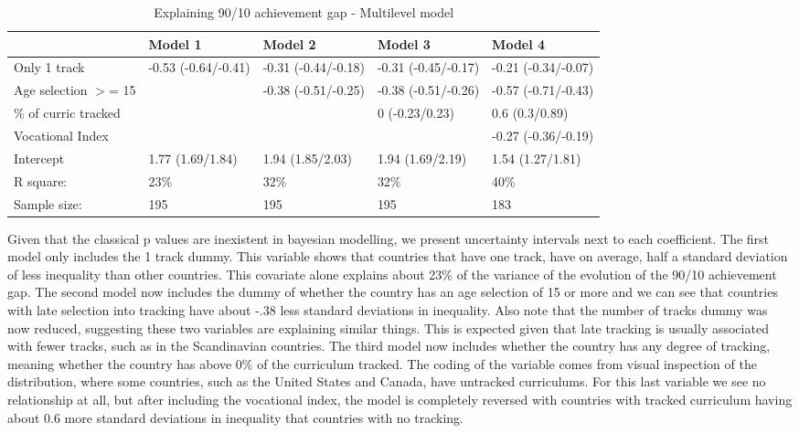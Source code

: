 \documentclass[11pt, a4paper]{article}\usepackage[]{graphicx}\usepackage[]{color}
\begin{document}
\begin{table}[ht]
\centering
\begin{tabular}{lllll}
  \hline
  & Model 1 & Model 2 & Model 3 & Model 4 \\ 
  \hline
Only 1 track & -0.53 (-0.64/-0.41) & -0.31 (-0.44/-0.18) & -0.31 (-0.45/-0.17) & -0.21 (-0.34/-0.07) \\ 
  Age selection $>$= 15 &  & -0.38 (-0.51/-0.25) & -0.38 (-0.51/-0.26) & -0.57 (-0.71/-0.43) \\ 
  \% of curric tracked &  &  & 0 (-0.23/0.23) & 0.6 (0.3/0.89) \\ 
  Vocational Index &  &  &  & -0.27 (-0.36/-0.19) \\ 
  Intercept & 1.77 (1.69/1.84) & 1.94 (1.85/2.03) & 1.94 (1.69/2.19) & 1.54 (1.27/1.81) \\ 
   \hline R square: & 23\% & 32\% & 32\% & 40\% \\ Sample size: & 195 & 195 & 195 & 183 \\ \hline \hline
\end{tabular}
\caption{Explaining 90/10 achievement gap - Multilevel model} 
\end{table}


Given that the classical p values are inexistent in bayesian modelling, we present uncertainty intervals next to each coefficient. The first model only includes the 1 track dummy. This variable shows that countries that have one track, have on average, half a standard deviation of less inequality than other countries. This covariate alone explains about 23\% of the variance of the evolution of the 90/10 achievement gap. The second model now includes the dummy of whether the country has an age selection of 15 or more and we can see that countries with late selection into tracking have about -.38 less standard deviations in inequality. Also note that the number of tracks dummy was now reduced, suggesting these two variables are explaining similar things. This is expected given that late tracking is usually associated with fewer tracks, such as in the Scandinavian countries. The third model now includes whether the country has any degree of tracking, meaning whether the country has above 0\% of the curriculum tracked. The coding of the variable comes from visual inspection of the distribution, where some countries, such as the United States and Canada, have untracked curriculums. For this last variable we see no relationship at all, but after including the vocational index, the model is completely reversed with countries with tracked curriculum having about 0.6 more standard deviations in inequality that countries with no tracking.
\end{document}
